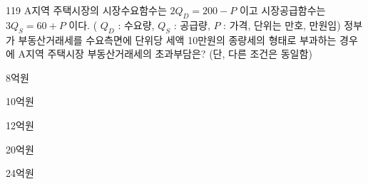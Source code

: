 \begin{question}{119}
A지역 주택시장의 시장수요함수는 $2Q_{D}=200-P$ 이고 시장공급함수는 $3Q_{S}=60+P$ 이다. ( $Q_{D}$ : 수요량, $Q_{S}$ : 공급량, $P$ : 가격, 단위는 만호, 만원임) 정부가 부동산거래세를 수요측면에 단위당 세액 10만원의 종량세의 형태로 부과하는 경우에 A지역 주택시장 부동산거래세의 초과부담은? (단, 다른 조건은 동일함)
\begin{choices}
  \item 8억원
  \item 10억원
  \item 12억원
  \item 20억원
  \item 24억원
\end{choices}
\end{question}
